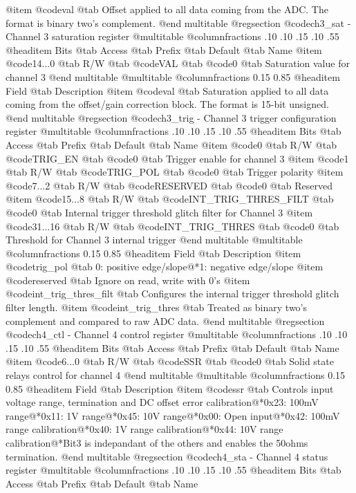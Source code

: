 @item @code{val} @tab Offset applied to all data coming from the ADC. The format is binary two's complement.
@end multitable
@regsection @code{ch3_sat} - Channel 3 saturation register
@multitable @columnfractions .10 .10 .15 .10 .55
@headitem Bits @tab Access @tab Prefix @tab Default @tab Name
@item @code{14...0}
@tab R/W @tab
@code{VAL}
@tab @code{0} @tab 
Saturation value for channel 3
@end multitable
@multitable @columnfractions 0.15 0.85
@headitem Field @tab Description
@item @code{val} @tab Saturation applied to all data coming from the offset/gain correction block. The format is 15-bit unsigned.
@end multitable
@regsection @code{ch3_trig} - Channel 3 trigger configuration register
@multitable @columnfractions .10 .10 .15 .10 .55
@headitem Bits @tab Access @tab Prefix @tab Default @tab Name
@item @code{0}
@tab R/W @tab
@code{TRIG_EN}
@tab @code{0} @tab 
Trigger enable for channel 3
@item @code{1}
@tab R/W @tab
@code{TRIG_POL}
@tab @code{0} @tab 
Trigger polarity
@item @code{7...2}
@tab R/W @tab
@code{RESERVED}
@tab @code{0} @tab 
Reserved
@item @code{15...8}
@tab R/W @tab
@code{INT_TRIG_THRES_FILT}
@tab @code{0} @tab 
Internal trigger threshold glitch filter for Channel 3
@item @code{31...16}
@tab R/W @tab
@code{INT_TRIG_THRES}
@tab @code{0} @tab 
Threshold for Channel 3 internal trigger
@end multitable
@multitable @columnfractions 0.15 0.85
@headitem Field @tab Description
@item @code{trig_pol} @tab 0: positive edge/slope@*1: negative edge/slope
@item @code{reserved} @tab Ignore on read, write with 0's
@item @code{int_trig_thres_filt} @tab Configures the internal trigger threshold glitch filter length.
@item @code{int_trig_thres} @tab Treated as binary two's complement and compared to raw ADC data.
@end multitable
@regsection @code{ch4_ctl} - Channel 4 control register
@multitable @columnfractions .10 .10 .15 .10 .55
@headitem Bits @tab Access @tab Prefix @tab Default @tab Name
@item @code{6...0}
@tab R/W @tab
@code{SSR}
@tab @code{0} @tab 
Solid state relays control for channel 4
@end multitable
@multitable @columnfractions 0.15 0.85
@headitem Field @tab Description
@item @code{ssr} @tab Controls input voltage range, termination and DC offset error calibration@*0x23: 100mV range@*0x11: 1V range@*0x45: 10V range@*0x00: Open input@*0x42: 100mV range calibration@*0x40: 1V range calibration@*0x44: 10V range calibration@*Bit3 is indepandant of the others and enables the 50ohms termination.
@end multitable
@regsection @code{ch4_sta} - Channel 4 status register
@multitable @columnfractions .10 .10 .15 .10 .55
@headitem Bits @tab Access @tab Prefix @tab Default @tab Name
